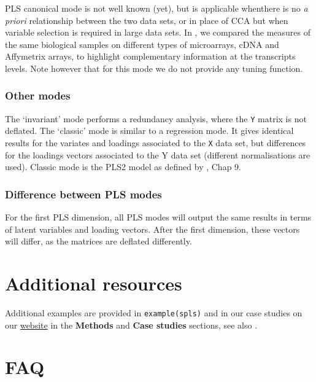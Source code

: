 \documentclass[]{book}
\theoremstyle{definition}
\theoremstyle{definition}
\theoremstyle{definition}
\theoremstyle{remark}
\begin{document}
PLS canonical mode is not well known (yet), but is applicable whenthere
is no \emph{a priori} relationship between the two data sets, or in
place of CCA but when variable selection is required in large data sets.
In \citep{Lec09a}, we compared the measures of the same biological
samples on different types of microarrays, cDNA and Affymetrix arrays,
to highlight complementary information at the transcripts levels. Note
however that for this mode we do not provide any tuning function.

\subsubsection{Other modes}\label{other-modes}

The `invariant' mode performs a redundancy analysis, where the
\texttt{Y} matrix is not deflated. The `classic' mode is similar to a
regression mode. It gives identical results for the variates and
loadings associated to the \texttt{X} data set, but differences for the
loadings vectors associated to the Y data set (different normalisations
are used). Classic mode is the PLS2 model as defined by \citep{Ten98},
Chap 9.

\subsubsection{Difference between PLS
modes}\label{difference-between-pls-modes}

For the first PLS dimension, all PLS modes will output the same results
in terms of latent variables and loading vectors. After the first
dimension, these vectors will differ, as the matrices are deflated
differently.

\section{Additional resources}\label{additional-resources-2}

Additional examples are provided in \texttt{example(spls)} and in our
case studies on our \href{http://www.mixomics.org}{website} in the
\textbf{Methods} and \textbf{Case studies} sections, see also
\citep{Lec08, Lec09}.

\section{FAQ}\label{faq-2}
\end{document}
